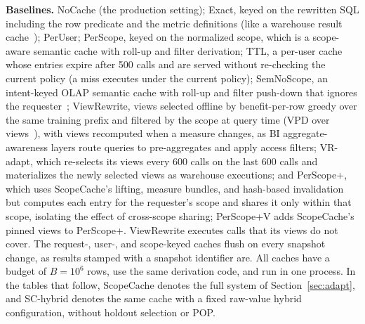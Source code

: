 \documentclass[sigconf, nonacm]{acmart}
\newcommand{\M}[1]{\textsf{#1}}
\begin{document}
\textbf{Baselines.} \M{NoCache} (the production setting); \M{Exact}, keyed on the rewritten SQL including the row predicate and the metric definitions (like a warehouse result cache~\cite{snowflake16}); \M{PerUser}; \M{PerScope}, keyed on the normalized scope, which is a scope-aware semantic cache with roll-up and filter derivation; \M{TTL}, a per-user cache whose entries expire after 500 calls and are served without re-checking the current policy (a miss executes under the current policy); \M{SemNoScope}, an intent-keyed OLAP semantic cache with roll-up and filter push-down that ignores the requester~\cite{bindschaedler26}; \M{ViewRewrite}, views selected offline by benefit-per-row greedy over the same training prefix and filtered by the scope at query time (VPD over views~\cite{rizvi04,hru96}), with views recomputed when a measure changes, as BI aggregate-awareness layers route queries to pre-aggregates and apply access filters; \M{VR-adapt}, which re-selects its views every 600 calls on the last 600 calls and materializes the newly selected views as warehouse executions; and \M{PerScope+}, which uses ScopeCache's lifting, measure bundles, and hash-based invalidation but computes each entry for the requester's scope and shares it only within that scope, isolating the effect of cross-scope sharing; \M{PerScope+V} adds ScopeCache's pinned views to \M{PerScope+}. \M{ViewRewrite} executes calls that its views do not cover. The request-, user-, and scope-keyed caches flush on every snapshot change, as results stamped with a snapshot identifier are. All caches have a budget of $B=10^6$ rows, use the same derivation code, and run in one process. In the tables that follow, ScopeCache denotes the full system of Section~\ref{sec:adapt}, and \M{SC-hybrid} denotes the same cache with a fixed raw-value hybrid configuration, without holdout selection or POP.
\end{document}
